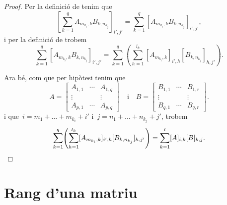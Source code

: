 \documentclass[../../main.tex]{subfiles}
\begin{document}
\begin{proposition}
\begin{proof}
            Per la definició de  tenim que
            \[
                \left[\sum_{k=1}^{q}A_{m_{k_{i}},k}B_{k,n_{k_{j}}}\right]_{i',j'}=\sum_{k=1}^{q}[A_{m_{k_{i}},k}B_{k,n_{k_{j}}}]_{i',j'},
            \]
            i per la definició de  trobem
            \[
                \sum_{k=1}^{q}[A_{m_{k_{i}},k}B_{k,n_{k_{j}}}]_{i',j'}=\sum_{k=1}^{q}\left(\sum_{h=1}^{l_{k}}[A_{m_{k_{i}},k}]_{i',h}[B_{k,n_{k_{j}}}]_{h,j'}\right).
            \]

            Ara bé, com que per hipòtesi tenim que
            \[A=\left[\begin{matrix}
            A_{1,1} & \cdots & A_{1,q} \\
            \vdots & & \vdots \\
            A_{p,1} & \cdots & A_{p,q}
            \end{matrix}\right]\quad\text{i}\quad B=\left[\begin{matrix}
            B_{1,1} & \cdots & B_{1,r} \\
            \vdots & & \vdots \\
            B_{q,1} & \cdots & B_{q,r}
            \end{matrix}\right].\]
            i que~\(i=m_{1}+\dots+m_{k_{i}}+i'\) i~\(j=n_{1}+\dots+n_{k_{j}}+j'\), trobem
            \[
                \sum_{k=1}^{q}\left(\sum_{h=1}^{l_{k}}[A_{m_{k_{i}},k}]_{i',h}[B_{k,n_{k_{j}}}]_{h,j'}\right)=\sum_{k=1}^{l}[A]_{i,k}[B]_{k,j}.\qedhere
            \]
        \end{proof}
    \end{proposition}
\section{Rang d'una matriu}
\end{document}
